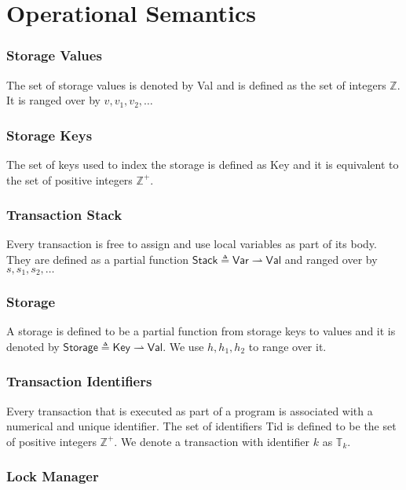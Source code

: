 \section{Operational Semantics}

\subsubsection{Storage Values}

The set of storage values is denoted by \textsf{Val} and is defined as the set of integers $\mathds{Z}$. It is ranged over by $v, v_1, v_2, \ldots$

\subsubsection{Storage Keys}

The set of keys used to index the storage is defined as \textsf{Key} and it is equivalent to the set of positive integers $\mathds{Z}^+$.

\subsubsection{Transaction Stack}

Every transaction is free to assign and use local variables as part of its body. They are defined as a partial function $\mathsf{Stack} \triangleq \mathsf{Var} \rightharpoonup \mathsf{Val}$ and ranged over by $s, s_1, s_2, \ldots$

\subsubsection{Storage}

A storage is defined to be a partial function from storage keys to values and it is denoted by $\mathsf{Storage} \triangleq \mathsf{Key} \rightharpoonup \mathsf{Val}$. We use $h, h_1, h_2$ to range over it.

\subsubsection{Transaction Identifiers}

Every transaction that is executed as part of a program is associated with a numerical and unique identifier. The set of identifiers \textsf{Tid} is defined to be the set of positive integers $\mathds{Z}^+$. We denote a transaction with identifier $k$ as $\mathds{T}_k$.

\subsubsection{Lock Manager}


